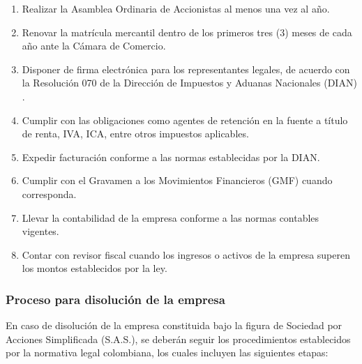 \begin{enumerate}
	\item Realizar la Asamblea Ordinaria de Accionistas al menos una vez al año.

	\item Renovar la matrícula mercantil dentro de los primeros tres (3) meses de cada año ante la Cámara de Comercio.

	\item Disponer de firma electrónica para los representantes legales, de acuerdo con la Resolución 070 de la Dirección de Impuestos y Aduanas Nacionales (DIAN) \parencite{Resolucion70}.

	\item Cumplir con las obligaciones como agentes de retención en la fuente a título de renta, IVA, ICA, entre otros impuestos aplicables.

	\item Expedir facturación conforme a las normas establecidas por la DIAN.

	\item Cumplir con el Gravamen a los Movimientos Financieros (GMF) cuando corresponda.

	\item Llevar la contabilidad de la empresa conforme a las normas contables vigentes.

	\item Contar con revisor fiscal cuando los ingresos o activos de la empresa superen los montos establecidos por la ley.
\end{enumerate}

\subsubsection*{Proceso para disolución de la empresa}

En caso de disolución de la empresa constituida bajo la figura de Sociedad por Acciones Simplificada (S.A.S.), se deberán seguir los procedimientos establecidos por la normativa legal colombiana, los cuales incluyen las siguientes etapas:

